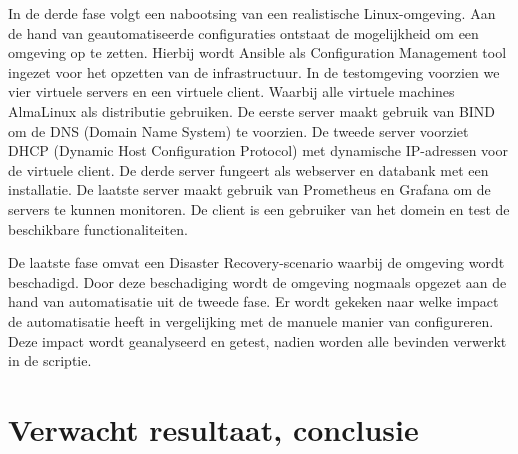 In de derde fase volgt een nabootsing van een realistische Linux-omgeving. Aan de hand van geautomatiseerde configuraties ontstaat de mogelijkheid om een omgeving op te zetten. Hierbij wordt Ansible als Configuration Management tool ingezet voor het opzetten van de infrastructuur. In de testomgeving voorzien we vier virtuele servers en een virtuele client. Waarbij alle virtuele machines AlmaLinux \autocite{AOF2022} als distributie gebruiken. De eerste server maakt gebruik van BIND \autocite{ISC2022} om de DNS (Domain Name System) te voorzien. De tweede server voorziet DHCP (Dynamic Host Configuration Protocol) met dynamische IP-adressen voor de virtuele client. De derde server fungeert als webserver en databank met een \textcite{WordPress2022} installatie. De laatste server maakt gebruik van Prometheus \autocite{PrometheusAuthors2022} en Grafana \autocite{GrafanaLabs2022} om de servers te kunnen monitoren. De client is een gebruiker van het domein en test de beschikbare functionaliteiten.

De laatste fase omvat een Disaster Recovery-scenario waarbij de omgeving wordt beschadigd. Door deze beschadiging wordt de omgeving nogmaals opgezet aan de hand van automatisatie uit de tweede fase. Er wordt gekeken naar welke impact de automatisatie heeft in vergelijking met de manuele manier van configureren. Deze impact wordt geanalyseerd en getest, nadien worden alle bevinden verwerkt in de scriptie.


\section{Verwacht resultaat, conclusie}%
\label{sec:verwachte_resultaten}

\begin{comment}

Hier beschrijf je welke resultaten je verwacht. Als je metingen en simulaties uitvoert, kan je hier al mock-ups maken van de grafieken samen met de verwachte conclusies. Benoem zeker al je assen en de onderdelen van de grafiek die je gaat gebruiken. Dit zorgt ervoor dat je concreet weet welk soort data je moet verzamelen en hoe je die moet meten.

Wat heeft de doelgroep van je onderzoek aan het resultaat? Op welke manier zorgt jouw bachelorproef voor een meerwaarde?

Hier beschrijf je wat je verwacht uit je onderzoek, met de motivatie waarom. Het is \textbf{niet} erg indien uit je onderzoek andere resultaten en conclusies vloeien dan dat je hier beschrijft: het is dan juist interessant om te onderzoeken waarom jouw hypothesen niet overeenkomen met de resultaten.

\end{comment}

